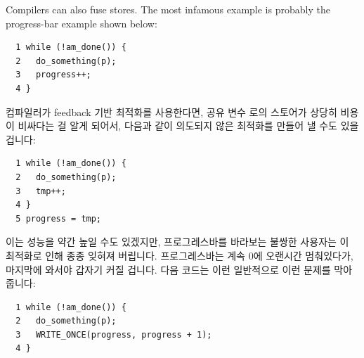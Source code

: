 Compilers can also fuse stores.
The most infamous example is probably the progress-bar example
shown below:
\fi

\vspace{5pt}
\begin{minipage}[t]{\columnwidth}
\scriptsize
\begin{verbatim}
  1 while (!am_done()) {
  2   do_something(p);
  3   progress++;
  4 }
\end{verbatim}
\end{minipage}
\vspace{5pt}

컴파일러가 feedback 기반 최적화를 사용한다면, 공유 변수  로의
스토어가 상당히 비용이 비싸다는 걸 알게 되어서, 다음과 같이 의도되지 않은
최적화를 만들어 낼 수도 있을 겁니다:

\vspace{5pt}
\begin{minipage}[t]{\columnwidth}
\scriptsize
\begin{verbatim}
  1 while (!am_done()) {
  2   do_something(p);
  3   tmp++;
  4 }
  5 progress = tmp;
\end{verbatim}
\end{minipage}
\vspace{5pt}

이는 성능을 약간 높일 수도 있겠지만, 프로그레스바를 바라보는 불쌍한 사용자는 이
최적화로 인해 종종 잊혀져 버립니다.
프로그레스바는 계속 0에 오랜시간 멈춰있다가, 마지막에 와서야 갑자기 커질
겁니다.
다음 코드는 이런 일반적으로 이런 문제를 막아줍니다:

\vspace{5pt}
\begin{minipage}[t]{\columnwidth}
\scriptsize
\begin{verbatim}
  1 while (!am_done()) {
  2   do_something(p);
  3   WRITE_ONCE(progress, progress + 1);
  4 }
\end{verbatim}
\end{minipage}
\vspace{5pt}


